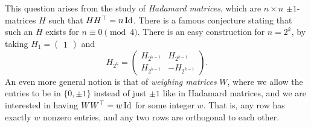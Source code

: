 	This question arises from the study of \emph{Hadamard matrices}, which are $n \times n$ $\pm 1$-matrices $H$ such that $HH^\top = n \operatorname{Id}$. There is a famous conjecture stating that such an $H$ exists for $n \equiv 0 \pmod{4}$. There is an easy construction for $n = 2^k$, by taking $H_1 = \begin{pmatrix} 1 \end{pmatrix}$ and
	\[
	H_{2^k} = 
	\begin{pmatrix}
		H_{2^{k-1}} & H_{2^{k-1}} \\ H_{2^{k-1}} & -H_{2^{k-1}}
	\end{pmatrix}.
	\]
	An even more general notion is that of \emph{weighing matrices} $W$, where we allow the entries to be in $\{0,\pm 1\}$ instead of just $\pm 1$ like in Hadamard matrices, and we are interested in having $WW^\top = w \operatorname{Id}$ for some integer $w$. That is, any row has exactly $w$ nonzero entries, and any two rows are orthogonal to each other.

\clearpage
